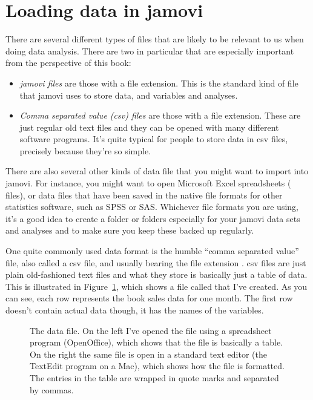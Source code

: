 \section{Loading data in jamovi\label{sec:load}}

There are several different types of files that are likely to be relevant to us when doing data analysis. There are two in particular that are especially important from the perspective of this book:
\begin{itemize}
\item {\it jamovi files} are those with a  file extension. This is the standard kind of file that jamovi uses to store data, and variables and analyses. 
\item {\it Comma separated value (csv) files} are those with a  file extension. These are just regular old text files and they can be opened with many different software programs. It's quite typical for people to store data in csv files, precisely because they're so simple.
\end{itemize} 

There are also several other kinds of data file that you might want to import into jamovi. For instance, you might want to open Microsoft Excel spreadsheets ( files), or data files that have been saved in the native file formats for other statistics software, such as SPSS or SAS.  Whichever file formats you are using, it's a good idea to create a folder or folders especially for your jamovi data sets and analyses and to make sure you keep these backed up regularly. 


One quite commonly used data format is the humble ``comma separated value'' file, also called a csv file, and usually bearing the file extension . csv files are just plain old-fashioned text files and what they store is basically just a table of data. This is illustrated in Figure~\ref{fig:booksalescsv}, which shows a file called  that I've created. As you can see, each row represents the book sales data for one month. The first row doesn't contain actual data though, it has the names of the variables.

\begin{figure}
\begin{center}
\caption{The  data file. On the left I've opened the file using a spreadsheet program (OpenOffice), which shows that the file is basically a table. On the right the same file is open in a standard text editor (the TextEdit program on a Mac), which shows how the file is formatted. The entries in the table are wrapped in quote marks and separated by commas.}
\HR
\label{fig:booksalescsv}
\end{center}
\end{figure} 

